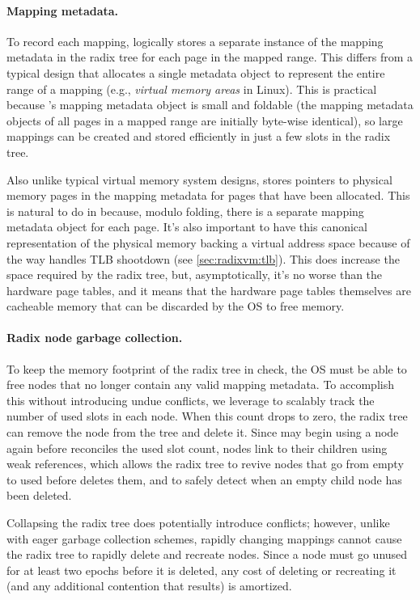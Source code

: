 \paragraph{Mapping metadata.}
To record each mapping, \vm logically stores a separate instance of
the mapping metadata
in the radix tree for each page in the mapped range.  This differs
from a typical design that allocates a single metadata object
to represent the entire range of a mapping (e.g., \emph{virtual memory
areas} in Linux).
%
This is practical because \vm's mapping metadata object is small and
foldable (the mapping metadata objects of all pages in a mapped range
are initially byte-wise identical), so large mappings can be
created and stored efficiently in just a few slots in the radix tree.

Also unlike typical virtual memory system designs, \vm stores pointers
to physical memory pages in the mapping metadata for pages that have
been allocated.  This is natural to do in \vm because, modulo folding,
there is a separate mapping metadata object for each page.  It's also
important to have this canonical representation of the physical memory
backing a virtual address space because of the way \vm handles TLB
shootdown (see \cref{sec:radixvm:tlb}).  This does increase the space
required by the radix tree, but, asymptotically, it's no worse than
the hardware page tables, and it means that the hardware page tables
themselves are cacheable memory that can be discarded by the OS to
free memory.

\paragraph{Radix node garbage collection.}
To keep the memory footprint of the radix tree in check, the OS must be
able to free nodes that no longer contain any valid mapping metadata.
To accomplish this without introducing undue conflicts, we leverage
 to scalably track the number of used slots in each node.
When this count drops to zero, the radix tree can remove the node from
the tree and delete it.  Since \vm may begin using a node again before
 reconciles the used slot count, nodes link to their children
using weak references, which allows the radix tree to revive nodes
that go from empty to used before  deletes them, and to
safely detect when an empty child node has been deleted.

Collapsing the radix tree does potentially introduce conflicts;
however, unlike with eager garbage collection schemes, rapidly
changing
mappings cannot cause the radix tree to rapidly delete and recreate
nodes.  Since a node must go unused for at least two  epochs
before it is deleted, any cost of deleting or recreating it (and any
additional contention that results) is amortized.

